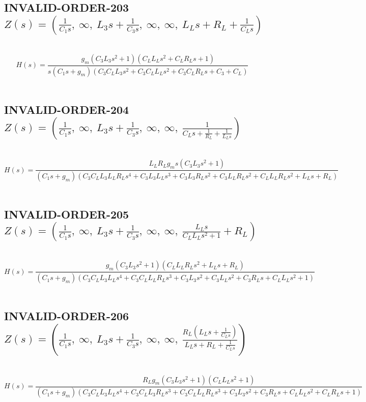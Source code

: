 \documentclass{article}
\begin{document}
\subsection{INVALID-ORDER-203 $Z(s) = \left( \frac{1}{C_{1} s}, \  \infty, \  L_{3} s + \frac{1}{C_{3} s}, \  \infty, \  \infty, \  L_{L} s + R_{L} + \frac{1}{C_{L} s}\right)$ } \ 
\textbf{\[H(s) = \frac{g_{m} \left(C_{3} L_{3} s^{2} + 1\right) \left(C_{L} L_{L} s^{2} + C_{L} R_{L} s + 1\right)}{s \left(C_{1} s + g_{m}\right) \left(C_{3} C_{L} L_{3} s^{2} + C_{3} C_{L} L_{L} s^{2} + C_{3} C_{L} R_{L} s + C_{3} + C_{L}\right)}\] } \ 
\subsection{INVALID-ORDER-204 $Z(s) = \left( \frac{1}{C_{1} s}, \  \infty, \  L_{3} s + \frac{1}{C_{3} s}, \  \infty, \  \infty, \  \frac{1}{C_{L} s + \frac{1}{R_{L}} + \frac{1}{L_{L} s}}\right)$ } \ 
\textbf{\[H(s) = \frac{L_{L} R_{L} g_{m} s \left(C_{3} L_{3} s^{2} + 1\right)}{\left(C_{1} s + g_{m}\right) \left(C_{3} C_{L} L_{3} L_{L} R_{L} s^{4} + C_{3} L_{3} L_{L} s^{3} + C_{3} L_{3} R_{L} s^{2} + C_{3} L_{L} R_{L} s^{2} + C_{L} L_{L} R_{L} s^{2} + L_{L} s + R_{L}\right)}\] } \ 
\subsection{INVALID-ORDER-205 $Z(s) = \left( \frac{1}{C_{1} s}, \  \infty, \  L_{3} s + \frac{1}{C_{3} s}, \  \infty, \  \infty, \  \frac{L_{L} s}{C_{L} L_{L} s^{2} + 1} + R_{L}\right)$ } \ 
\textbf{\[H(s) = \frac{g_{m} \left(C_{3} L_{3} s^{2} + 1\right) \left(C_{L} L_{L} R_{L} s^{2} + L_{L} s + R_{L}\right)}{\left(C_{1} s + g_{m}\right) \left(C_{3} C_{L} L_{3} L_{L} s^{4} + C_{3} C_{L} L_{L} R_{L} s^{3} + C_{3} L_{3} s^{2} + C_{3} L_{L} s^{2} + C_{3} R_{L} s + C_{L} L_{L} s^{2} + 1\right)}\] } \ 
\subsection{INVALID-ORDER-206 $Z(s) = \left( \frac{1}{C_{1} s}, \  \infty, \  L_{3} s + \frac{1}{C_{3} s}, \  \infty, \  \infty, \  \frac{R_{L} \left(L_{L} s + \frac{1}{C_{L} s}\right)}{L_{L} s + R_{L} + \frac{1}{C_{L} s}}\right)$ } \ 
\textbf{\[H(s) = \frac{R_{L} g_{m} \left(C_{3} L_{3} s^{2} + 1\right) \left(C_{L} L_{L} s^{2} + 1\right)}{\left(C_{1} s + g_{m}\right) \left(C_{3} C_{L} L_{3} L_{L} s^{4} + C_{3} C_{L} L_{3} R_{L} s^{3} + C_{3} C_{L} L_{L} R_{L} s^{3} + C_{3} L_{3} s^{2} + C_{3} R_{L} s + C_{L} L_{L} s^{2} + C_{L} R_{L} s + 1\right)}\] } \ 
\end{document}
